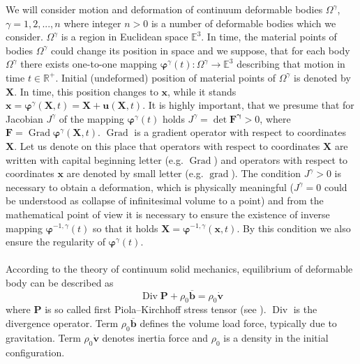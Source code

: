\documentclass{article}
\begin{document}
   We will consider motion and deformation of continuum deformable bodies $ \Omega^{\gamma} $, $\gamma = 1,2,...,n$ where integer $ n>0 $  is a number of deformable bodies which we consider. $\Omega^{\gamma}$ is a region in Euclidean space $\mathbb{E}^{3}$. In time, the material points of bodies $ \Omega^{\gamma} $ could change its position in space and we suppose, that for each body $ \Omega^{\gamma} $ there exists one-to-one mapping $\bm{\varphi}^{\gamma}(t) : \Omega^{\gamma} \longrightarrow \mathbb{E}^{3}$ describing that motion in time $t \in \mathbb{R}^{+}$. Initial (undeformed) position of material points of $ \Omega^{\gamma} $ is denoted by $ \mathbf{X} $. In time, this position changes to $ \mathbf{x} $, while it stands $\mathbf{x}=\bm{\varphi}^{\gamma}(\mathbf{X}, t) = \mathbf{X}+\mathbf{u}(\mathbf{X}, t)$. It is highly important, that we presume that for Jacobian $ J^{\gamma} $ of the mapping $\bm{\varphi}^{\gamma}(t)$ holds $J^{\gamma}=\operatorname{det} \mathbf{F^{\gamma}} > 0$, where $\mathbf{F}=\operatorname{Grad} \bm{\varphi}^{\gamma}(\mathbf{X}, t)$. $ \operatorname{Grad} $ is a gradient operator with respect to coordinates $ \mathbf{X} $. Let us denote on this place that operators with respect to coordinates $ \mathbf{X} $ are written with capital beginning letter (e.g. $ \operatorname{Grad} $) and operators with respect to coordinates $ \mathbf{x} $ are denoted by small letter (e.g. $ \operatorname{grad} $). The condition $J^{\gamma} > 0$ is necessary to obtain a deformation, which is physically meaningful ($ J^{\gamma} = 0 $ could be understood as collapse of infinitesimal volume to a point) and from the mathematical point of view it is necessary to ensure the existence of inverse mapping $ \bm{\varphi}^{-1,\gamma}(t) $ so that it holds $\mathbf{X}=\bm{\varphi}^{-1,\gamma}(\mathbf{x},t)$. By this condition we also ensure the regularity of $ \bm{\varphi}^{\gamma}(t) $. 
\\
\\
According to the theory of continuum solid mechanics, equilibrium of deformable body can be described as
\begin{equation}\label{1}
\operatorname{Div} \mathbf{P}+\rho_{0} \mathbf{\overline{b}}=\rho_{0} \dot{\mathbf{v}}
\end{equation}
where $ \mathbf{P} $ is so called first Piola–Kirchhoff stress tensor (see \cite[Chapter 2, p.28]{Wriggers}). $ \operatorname{Div} $ is the divergence operator. Term $ \rho_{0} \mathbf{\overline{b}} $ defines the volume load force, typically due to gravitation. Term $ \rho_{0} \dot{\mathbf{v}} $ denotes inertia force and $ \rho_{0} $ is a density in the initial configuration. 
\end{document}
